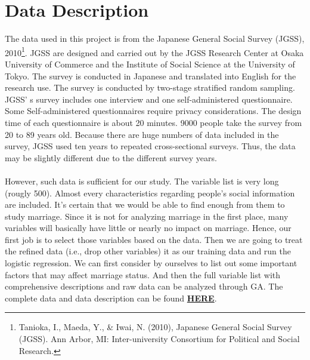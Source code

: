 \documentclass[12pt]{article}
\begin{document}
	\section{Data Description}
	The data used in this project is from the Japanese General Social Survey (JGSS), 2010\footnote{Tanioka, I., Maeda, Y., \& Iwai, N. (2010), Japanese General Social Survey (JGSS). Ann Arbor, MI: Inter-university Consortium for Political and Social Research.}. JGSS are designed and carried out by the JGSS Research Center at Osaka University of Commerce and the Institute of Social Science at the University of Tokyo. The survey is conducted in Japanese and translated into English for the research use. The survey is conducted by two-stage stratified random sampling. JGSS’ s survey includes one interview and one self-administered questionnaire. Some Self-administered questionnaires require privacy considerations. The design time of each questionnaire is about 20 minutes. 9000 people take the survey from 20 to 89 years old. Because there are huge numbers of data included in the survey, JGSS used ten years to repeated cross-sectional surveys. Thus, the data may be slightly different due to the different survey years. \\\\
	\noindent However, such data is sufficient for our study. The variable list is very long (rougly 500). Almost every characteristics regarding people's social information are included. It's certain that we would be able to find enough from them to study marriage. Since it is not for analyzing marriage in the first place, many variables will basically have little or nearly no impact on marriage. Hence, our first job is to select those variables based on the data. Then we are going to treat the refined data (i.e., drop other variables) it as our training data and run the logistic regression. We can first consider by ourselves to list out some important factors that may affect marriage status. And then the full variable list with comprehensive descriptions and raw data can be analyzed through GA. The complete data and data description can be found \href{https://github.com/QinganZhao/Data-Science/tree/master/database}{\textbf{HERE}}.\\
\end{document}
